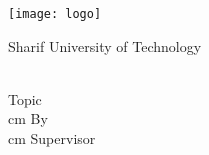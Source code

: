 \thispagestyle{empty}
\begin{center}
	\begin{latin}
		\texttt{[image: logo]}
		
		\begin{large}
		Sharif University of Technology \\ \enDep{} 
		\vskip 0.8cm
		\enlevel{} \entype{} \\ \enmajor{}
		
		\end{large}
		\vskip 3cm
		{Topic}         \\ \large{ \textbf{\entitle}}
		 cm
		{By}         \\ \large{\enAuthor}
		 cm
		{Supervisor} \\ \large{\ensupervisor}
		\vskip 1cm
		\large{\engdate}
	\end{latin}
\end{center}

